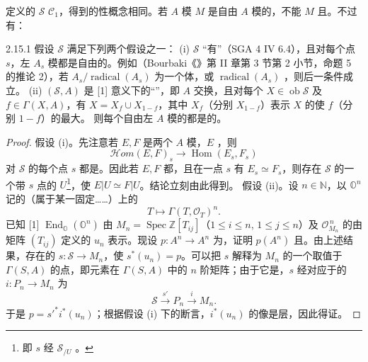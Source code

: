 定义的 $\mathscr S$  $\mathscr C_1$，得到的性概念相同。若 $A$ 模 $M$ 是自由 $A$ 模的，不能 $M$ 且。不过有：
\begin{SGAresult}{}{2.15.1}
假设 $\mathscr S$ 满足下列两个假设之一：
(i) $\mathscr S$ “有”（SGA 4 IV 6.4），且对每个点 $s$，左 $A_s$ 模都是自由的。例如（Bourbaki《》第 II 章第 3 节第 2 小节，命题 5 的推论 2），若 $A_s/\operatorname{radical}(A_s)$ 为一个体，或 $\operatorname{radical}(A_s)$ ，则后一条件成立。
(ii) $(\mathscr S,A)$ 是 [1] 意义下的“”，即 $A$ 交换，且对每个 $X\in\operatorname{ob}\mathscr S$ 及 $f\in\Gamma(X,A)$，有 $X=X_f\cup X_{1-f}$，其中 $X_f$（分别 $X_{1-f}$）表示 $X$ 的使 $f$（分别 $1-f$）的最大。
则每个自由左 $A$ 模的都是的。
\end{SGAresult}
\begin{proof}
假设 (i)。先注意若 $E,F$ 是两个 $A$ 模，$E$ ，则
\[\mathcal H om(E,F)_s\longrightarrow\operatorname{Hom}(E_s,F_s)\]
对 $\mathscr S$ 的每个点 $s$ 都是。因此若 $E,F$ 都，且在一点 $s$ 有 $E_s\simeq F_s$，则存在 $\mathscr S$ 的一个带 $s$ 点的 $U$\footnote{即 $s$ 经 $\mathscr S_{/U}$ 。}，使 $E|U\simeq F|U$。结论立刻由此得到。
假设 (ii)。设 $n\in\mathbb N$，以 $\mathbb O^n$ 记的（属于某一固定……）上的
\[T\longmapsto\Gamma(T,\mathcal O_T)^n.\]
已知 [1]  $\operatorname{End}_{\mathbb O}(\mathbb O^n)$ 由 $M_n=\operatorname{Spec}\mathbb Z[T_{ij}]$（$1\leq i\leq n$, $1\leq j\leq n$）及 $\mathcal O_{M_n}^{\,n}$ 的由矩阵 $(T_{ij})$ 定义的 $u_n$ 表示。现设 $p:A^n\to A^n$ 为，证明 $p(A^n)$ 且。由上述结果，存在的 $s:\mathscr S\to M_n$，使 $s^*(u_n)=p$。可以把 $s$ 解释为 $M_n$ 的一个取值于 $\Gamma(S,A)$ 的点，即元素在 $\Gamma(S,A)$ 中的 $n$ 阶矩阵；由于它是，$s$ 经对应于的 $i:P_n\to M_n$ 为
\[\mathscr S\xrightarrow{s'}P_n\xrightarrow i M_n.\]
于是 $p=s'^*i^*(u_n)$；根据假设 (i) 下的断言，$i^*(u_n)$ 的像是层，因此得证。
\end{proof}
